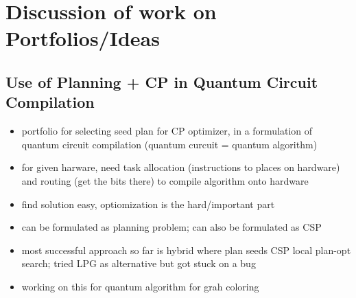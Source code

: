 \section{Discussion of work on Portfolios/Ideas}


















\subsection{Use of Planning + CP in Quantum Circuit Compilation}

\begin{itemize}

\item portfolio for selecting seed plan for CP optimizer, in a
  formulation of quantum circuit compilation (quantum curcuit =
  quantum algorithm)

\item for given harware, need task allocation (instructions to places
  on hardware) and routing (get the bits there) to compile algorithm
  onto hardware

\item find solution easy, optiomization is the hard/important part

\item can be formulated as planning problem; can also be formulated as
  CSP

\item most successful approach so far is hybrid where plan seeds CSP
  local plan-opt search; tried LPG as alternative but got stuck on a
  bug

\item working on this for quantum algorithm for grah coloring

\end{itemize}

















